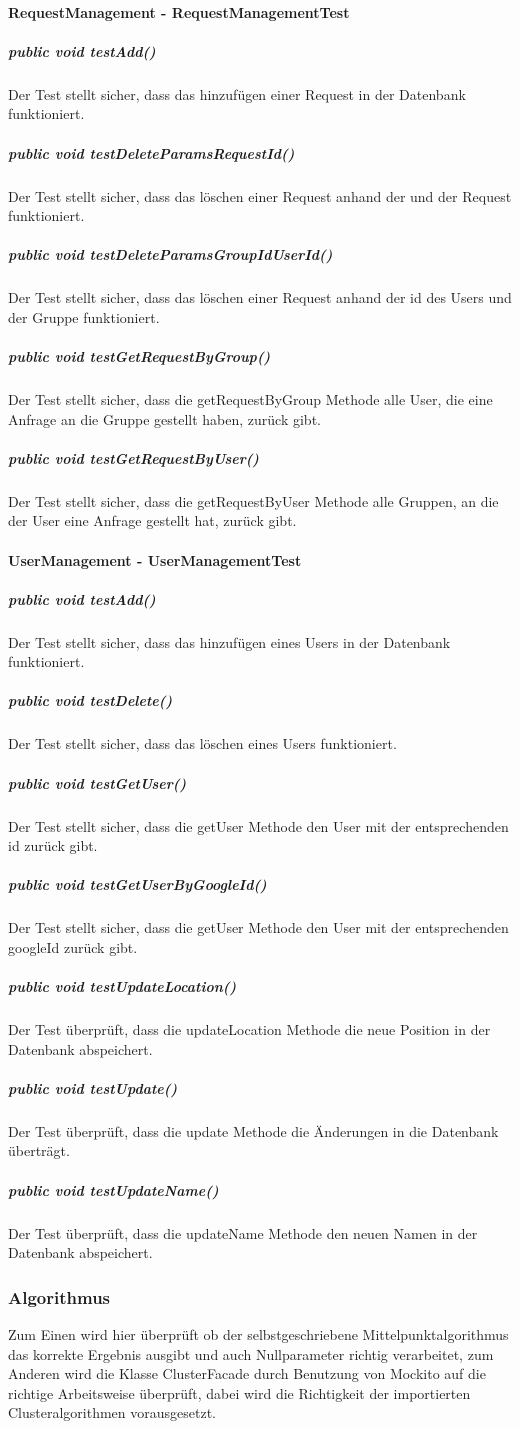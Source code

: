 \documentclass{scrartcl}
\begin{document}
 	\paragraph{RequestManagement - RequestManagementTest}
 	 \subparagraph{    public void testAdd()     }
	Der Test stellt sicher, dass das hinzufügen einer Request in der Datenbank funktioniert.
    \subparagraph{    public void testDeleteParamsRequestId()     }
	Der Test stellt sicher, dass das löschen einer Request anhand der und der Request funktioniert.
    \subparagraph{    public void testDeleteParamsGroupIdUserId()     }
    	Der Test stellt sicher, dass das löschen einer Request anhand der id des Users und der Gruppe funktioniert.
    \subparagraph{    public void testGetRequestByGroup()     }
   	Der Test stellt sicher, dass die getRequestByGroup Methode alle User, die eine Anfrage an die Gruppe gestellt haben, zurück gibt.
    \subparagraph{    public void testGetRequestByUser()    }
   	Der Test stellt sicher, dass die getRequestByUser Methode alle Gruppen, an die der User eine Anfrage gestellt hat, zurück gibt.
   	
	\paragraph{UserManagement - UserManagementTest}
    \subparagraph{    public void testAdd()   }
	Der Test stellt sicher, dass das hinzufügen eines Users in der Datenbank funktioniert.
    \subparagraph{    public void testDelete()   }
	Der Test stellt sicher, dass das löschen eines Users funktioniert.
    \subparagraph{    public void testGetUser()  }
   	Der Test stellt sicher, dass die getUser Methode den User mit der entsprechenden id zurück gibt.
    \subparagraph{ public void testGetUserByGoogleId()     }
   	Der Test stellt sicher, dass die getUser Methode den User mit der entsprechenden googleId zurück gibt.
    \subparagraph{    public void testUpdateLocation()     }
   	Der Test überprüft, dass die updateLocation Methode die neue Position in der Datenbank abspeichert.	
    \subparagraph{    public void testUpdate()     }
   	Der Test überprüft, dass die update Methode die Änderungen in die Datenbank überträgt.	
    \subparagraph{    public void testUpdateName()     }	
   	Der Test überprüft, dass die updateName Methode den neuen Namen in der Datenbank abspeichert.	
   	
   	
	\subsubsection{Algorithmus}
	Zum Einen wird hier überprüft ob der selbstgeschriebene Mittelpunktalgorithmus das korrekte Ergebnis ausgibt und auch Nullparameter richtig verarbeitet, zum Anderen wird die Klasse ClusterFacade durch Benutzung von Mockito auf die richtige Arbeitsweise überprüft, dabei wird die Richtigkeit der importierten Clusteralgorithmen vorausgesetzt. 
\end{document}
